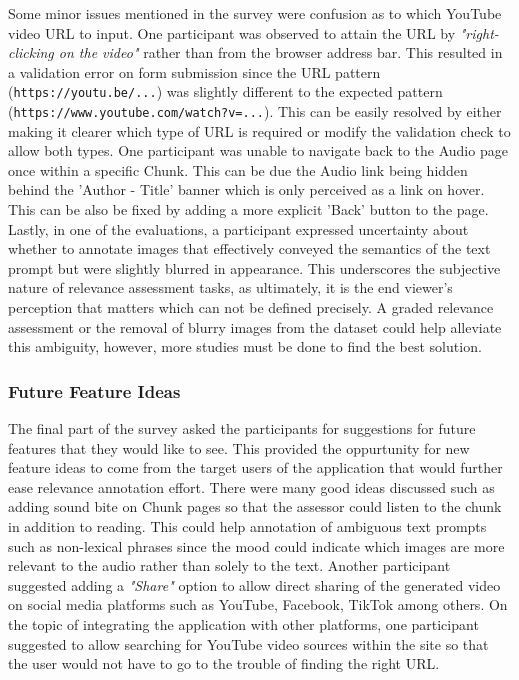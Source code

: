 \documentclass{l4proj}
\begin{document}
Some minor issues mentioned in the survey were confusion as to which YouTube video URL to input. One participant was observed to attain the URL by \emph{"right-clicking on the video"} rather than from the browser address bar. This resulted in a validation error on form submission since the URL pattern (\lstinline|https://youtu.be/...|) was slightly different to the expected pattern (\lstinline|https://www.youtube.com/watch?v=...|). This can be easily resolved by either making it clearer which type of URL is required or modify the validation check to allow both types. One participant was unable to navigate back to the Audio page once within a specific Chunk. This can be due the Audio link being hidden behind the 'Author - Title' banner which is only perceived as a link on hover. This can be also be fixed by adding a more explicit 'Back' button to the page. Lastly, in one of the evaluations, a participant expressed uncertainty about whether to annotate images that effectively conveyed the semantics of the text prompt but were slightly blurred in appearance. This underscores the subjective nature of relevance assessment tasks, as ultimately, it is the end viewer's perception that matters which can not be defined precisely. A graded relevance assessment or the removal of blurry images from the dataset could help alleviate this ambiguity, however, more studies must be done to find the best solution.

\subsubsection{Future Feature Ideas}
The final part of the survey asked the participants for suggestions for future features that they would like to see. This provided the oppurtunity for new feature ideas to come from the target users of the application that would further ease relevance annotation effort. There were many good ideas discussed such as adding sound bite on Chunk pages so that the assessor could listen to the chunk in addition to reading. This could help annotation of ambiguous text prompts such as non-lexical phrases since the mood could indicate which images are more relevant to the audio rather than solely to the text. Another participant suggested adding a \emph{"Share"} option to allow direct sharing of the generated video on social media platforms such as YouTube, Facebook, TikTok among others. On the topic of integrating the application with other platforms, one participant suggested to allow searching for YouTube video sources within the site so that the user would not have to go to the trouble of finding the right URL. 
\end{document}
